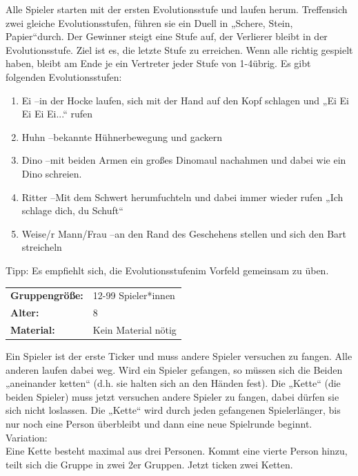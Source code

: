     Alle Spieler starten mit der ersten Evolutionsstufe und laufen herum. Treffensich zwei gleiche Evolutionsstufen, führen sie ein Duell in „Schere, Stein, Papier“durch. Der Gewinner steigt eine Stufe auf, der Verlierer bleibt in der Evolutionsstufe. Ziel ist es, die letzte Stufe zu erreichen. Wenn alle richtig gespielt haben, bleibt am Ende je ein Vertreter jeder Stufe von 1-4übrig. Es gibt folgenden Evolutionsstufen:
    \begin{enumerate}
        \item Ei –in der Hocke laufen, sich mit der Hand auf den Kopf schlagen und „Ei  Ei Ei Ei Ei...“ rufen
        \item Huhn –bekannte Hühnerbewegung und gackern
        \item Dino –mit beiden Armen ein großes Dinomaul nachahmen und dabei wie ein Dino schreien. 
        \item Ritter –Mit dem Schwert herumfuchteln und dabei immer wieder rufen „Ich schlage dich, du Schuft“
        \item Weise/r Mann/Frau –an den Rand des Geschehens stellen und sich den Bart streicheln
        
    \end{enumerate}
    Tipp: Es empfiehlt sich, die Evolutionsstufenim Vorfeld gemeinsam zu üben.





\begin{table}[H]
\begin{tabular}{>{\bfseries}lp{8cm}}
  Gruppengröße:   & 12-99 Spieler*innen\\
    Alter: & 8 \\
    Material: & Kein Material nötig \\ 
\end{tabular}
\end{table} 


Ein Spieler ist der erste Ticker und muss andere Spieler versuchen zu fangen.  Alle anderen laufen dabei weg. Wird ein Spieler gefangen, so müssen sich die Beiden „aneinander ketten“ (d.h. sie halten sich an den Händen fest). Die „Kette“ (die beiden Spieler) muss jetzt versuchen andere Spieler zu fangen, dabei dürfen sie sich nicht loslassen. Die „Kette“ wird durch jeden gefangenen Spielerlänger, bis nur noch eine Person überbleibt und dann eine neue Spielrunde beginnt.  \\ \newline
    Variation: \\ Eine Kette besteht maximal aus drei Personen. Kommt eine vierte Person hinzu, teilt sich die Gruppe in zwei 2er Gruppen. Jetzt ticken zwei Ketten.\\


